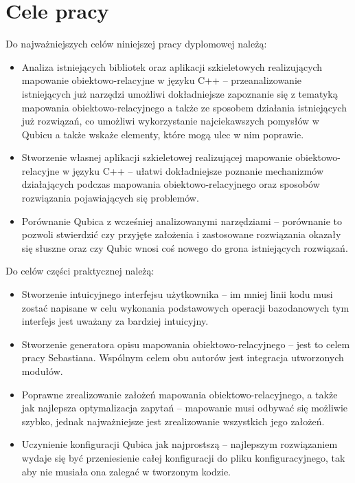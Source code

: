 \documentclass[12pt]{report}
\begin{document}
\section{Cele pracy}

Do najważniejszych celów niniejszej pracy dyplomowej należą:

\begin{itemize}
\item Analiza istniejących bibliotek oraz aplikacji szkieletowych realizujących ma\-po\-wa\-nie obiektowo-relacyjne w języku C++ -- przeanalizowanie istniejących już narzędzi
umożliwi dokładniejsze zapoznanie się z tematyką mapowania obiektowo-relacyjnego a także ze sposobem działania istniejących już rozwiązań, co umożliwi wykorzystanie 
najciekawszych pomysłów w Qubicu a także wskaże elementy, które mogą ulec w nim poprawie.
\item Stworzenie własnej aplikacji szkieletowej realizującej mapowanie obiektowo-relacyjne w języku C++ -- ułatwi dokładniejsze poznanie mechanizmów dzia\-łających
podczas mapowania obiektowo-relacyjnego oraz sposobów ro\-zwią\-zania pojawiających się problemów.
\item Porównanie Qubica z wcześniej analizowanymi narzędziami -- porównanie to pozwoli stwierdzić czy przyjęte założenia i zastosowane rozwiązania okazały się słuszne
oraz czy Qubic wnosi coś nowego do grona istniejących rozwiązań.
\end{itemize}

\newpage

Do celów części praktycznej należą:

\begin{itemize}
\item Stworzenie intuicyjnego interfejsu użytkownika -- im mniej linii kodu musi zostać napisane w celu wykonania podstawowych operacji bazodanowych tym interfejs jest 
uważany za bardziej intuicyjny.
\item Stworzenie generatora opisu mapowania obiektowo-relacyjnego -- jest to celem pracy Sebastiana. Wspólnym celem obu autorów jest integracja utworzonych  modułów.
\item Poprawne zrealizowanie założeń mapowania obiektowo-relacyjnego, a także jak najlepsza optymalizacja zapytań -- mapowanie musi odbywać się możliwie szybko, jednak
najważniejsze jest zrealizowanie wszystkich jego założeń.
\item Uczynienie konfiguracji Qubica jak najprostszą -- najlepszym rozwiązaniem wydaje się być przeniesienie całej konfiguracji do pliku konfiguracyjnego, tak aby nie musiała
ona zalegać w tworzonym kodzie.
\end{itemize}
\end{document}
